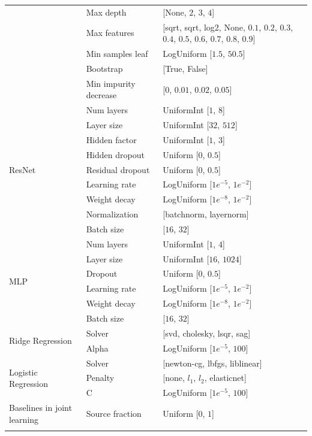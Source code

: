 \documentclass{article}
\theoremstyle{plain}
\theoremstyle{definition}
\theoremstyle{remark}
\begin{document}
\begin{table}[!h]
\begin{center}
\begin{tabular}{lll}
& Max depth & [None, $2$, $3$, $4$]\\
& Max features & [sqrt, sqrt, log2, None, $0.1$, $0.2$, $0.3$, $0.4$, $0.5$, $0.6$, $0.7$, $0.8$, $0.9$]\\
& Min samples leaf & LogUniform [$1.5$, $50.5$]\\
& Bootstrap & [True, False]\\
& Min impurity decrease & [$0$, $0.01$, $0.02$, $0.05$]\\
\midrule
\multirow{9}{*}{ResNet} & Num layers & UniformInt [$1$, $8$]\\
& Layer size & UniformInt [$32$, $512$]\\
& Hidden factor & UniformInt [$1$, $3$]\\
& Hidden dropout & Uniform [$0$, $0.5$]\\
& Residual dropout & Uniform [$0$, $0.5$]\\
& Learning rate & LogUniform [$1e^{-5}$, $1e^{-2}$]\\
& Weight decay & LogUniform [$1e^{-8}$, $1e^{-2}$]\\
& Normalization & [batchnorm, layernorm]\\
& Batch size & [$16$, $32$]\\
\midrule
\multirow{6}{*}{MLP} & Num layers & UniformInt [$1$, $4$]\\
& Layer size & UniformInt [$16$, $1024$]\\
& Dropout & Uniform [$0$, $0.5$]\\
& Learning rate & LogUniform [$1e^{-5}$, $1e^{-2}$]\\
& Weight decay & LogUniform [$1e^{-8}$, $1e^{-2}$]\\
& Batch size & [$16$, $32$]\\
\midrule
\multirow{2}{*}{Ridge Regression} & Solver & [svd, cholesky, lsqr, sag]\\
& Alpha & LogUniform [$1e^{-5}$, $100$]\\
\midrule
\multirow{3}{*}{Logistic Regression} & Solver & [newton-cg, lbfgs, liblinear]\\
& Penalty & [none, $l_1$, $l_2$, elasticnet]\\
& C & LogUniform [$1e^{-5}$, $100$]\\
\midrule
\multirow{1}{*}{Baselines in joint learning} & Source fraction & Uniform [$0$, $1$]\\
\bottomrule
\vspace{0.4cm}
\end{tabular}
\end{center}
\end{table}
\end{document}

